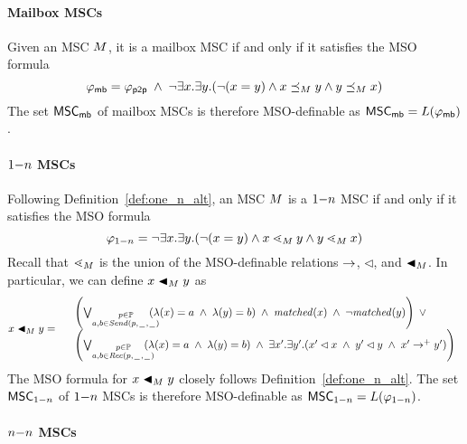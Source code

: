 \documentclass{article}
\begin{document}
\paragraph*{Mailbox MSCs}

Given an MSC $M$, it is a mailbox MSC if and only if it satisfies the MSO formula
\[
	\varphi_{\mathsf{mb}} = \varphi_{\mathsf{p2p}} \;\wedge\; \neg \exists x.\exists y.(\neg (x = y) \wedge x \preceq_M y \wedge y \preceq_M x)
\]
The set $\mathsf{MSC}_{\mathsf{mb}}$ of mailbox MSCs is therefore MSO-definable as $\mathsf{MSC}_{\mathsf{mb}}=L(\varphi_{\mathsf{mb}})$.

\paragraph*{$1\mathsf{-}n$ MSCs}

Following Definition~\ref{def:one_n_alt}, an MSC $M$ is a $1\mathsf{-}n$ MSC if and only if it satisfies the MSO formula
\[
	\varphi_{1\mathsf{-}n} = \neg \exists x.\exists y.(\neg (x = y) \wedge x \lessdot_M y \wedge y \lessdot_M x)
\]
Recall that $\lessdot_M$ is the union of the MSO-definable relations $\to$, $\lhd$, and $\blacktriangleleft_M$. In particular, we can define $x \blacktriangleleft_M y$ as 
\[
x \blacktriangleleft_M y =
\begin{array}{rl}
& \left(
	\bigvee_{\substack{p \in \mathbb{P}\\a,b \in {\mathit{Send}(p,\hspace{0.1em}\underline{\hspace{0.5em}}\hspace{0.1em},\hspace{0.1em}\underline{\hspace{0.5em}}\hspace{0.1em})}}}\hspace{-1em}
	(\lambda(x) = a \;\wedge\; \lambda(y) = b)
	\;\wedge\; \mathit{matched}(x) \;\wedge\; \neg \mathit{matched}(y)
\right) \;\vee\\
& \left(
	\bigvee_{\substack{p \in \mathbb{P}\\a,b \in {\mathit{Rec}(p,\hspace{0.1em}\underline{\hspace{0.5em}}\hspace{0.1em},\hspace{0.1em}\underline{\hspace{0.5em}}\hspace{0.1em})}}}\hspace{-1em}
	(\lambda(x) = a \;\wedge\; \lambda(y) = b)
	\;\wedge\; 
	\exists x'.\exists y'. (x' \lhd x \;\wedge\; y' \lhd y \;\wedge\; x' \to^+ y')
\right)\\
\end{array}
\]
The MSO formula for $x \blacktriangleleft_M y$ closely follows Definition~\ref{def:one_n_alt}. The set $\mathsf{MSC}_{1\mathsf{-}n}$ of $1\mathsf{-}n$ MSCs is therefore MSO-definable as $\mathsf{MSC}_{1\mathsf{-}n}=L(\varphi_{1\mathsf{-}n})$.

\paragraph*{$n\mathsf{-}n$ MSCs}
\end{document}
